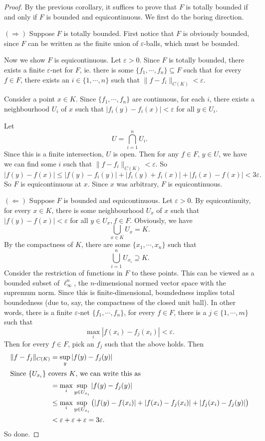 \documentclass[a4paper]{article}
\begin{document}
\begin{proof}
  By the previous corollary, it suffices to prove that $F$ is totally bounded if and only if $F$ is bounded and equicontinuous. We first do the boring direction.

  $(\Rightarrow)$ Suppose $F$ is totally bounded. First notice that $F$ is obviously bounded, since $F$ can be written as the finite union of $\varepsilon$-balls, which must be bounded.

  Now we show $F$ is equicontinuous. Let $\varepsilon > 0$. Since $F$ is totally bounded, there exists a finite $\varepsilon$-net for $F$, ie. there is some $\{f_1, \cdots, f_n\} \subseteq F$ such that for every $f \in F$, there exists an $i\in \{1, \cdots, n\}$ such that $\|f - f_i\|_{C(K)} < \varepsilon$.

  Consider a point $x \in K$. Since $\{f_1, \cdots, f_n\}$ are continuous, for each $i$, there exists a neighbourhood $U_i$ of $x$ such that $|f_i (y) - f_i(x)| < \varepsilon$ for all $y \in U_i$.

  Let
  \[
    U = \bigcap_{i = 1}^n U_i.
  \]
  Since this is a finite intersection, $U$ is open. Then for any $f \in F$, $y \in U$, we have we can find some $i$ such that $\|f - f_i\|_{C(K)} < \varepsilon$. So
  \[
    |f(y) - f(x)| \leq |f(y) - f_i(y)| + |f_i(y) + f_i(x)| + |f_i(x) - f(x)| < 3\varepsilon.
  \]
  So $F$ is equicontinuous at $x$. Since $x$ was arbitrary, $F$ is equicontinuous.

  $(\Leftarrow)$ Suppose $F$ is bounded and equicontinuous. Let $\varepsilon > 0$. By equicontinuity, for every $x \in K$, there is some neighbourhood $U_x$ of $x$ such that $|f(y) - f(x)| < \varepsilon$ for all $y \in U_x, f \in F$. Obviously, we have
  \[
    \bigcup_{x \in K}U_x = K.
  \]
  By the compactness of $K$, there are some $\{x_1, \cdots, x_n\}$ such that
  \[
    \bigcup_{i = 1}^n U_{x_i}\supseteq K.
  \]
  Consider the restriction of functions in $F$ to these points. This can be viewed as a bounded subset of $\ell^n_{\infty}$, the $n$-dimensional normed vector space with the supremum norm. Since this is finite-dimensional, boundedness implies total boundedness (due to, say, the compactness of the closed unit ball). In other words, there is a finite $\varepsilon$-net $\{f_1, \cdots, f_n\}$, for every $f \in F$, there is a $j \in \{1, \cdots, m\}$ such that
  \[
    \max_i |f(x_i) - f_j(x_i)| < \varepsilon.
  \]
  Then for every $f \in F$, pick an $f_j$ such that the above holds. Then
  \begin{align*}
    \|f - f_j\|_{C(K)} &= \sup_y |f(y) - f_j(y)|\\
    \intertext{Since $\{U_{x_i}\}$ covers $K$, we can write this as}
    &= \max_i \sup_{y \in U_{x_i}}|f(y) - f_j(y)|\\
    &\leq \max_i \sup_{y \in U_{x_i}} \big(|f(y) - f(x_i)| + |f(x_i) - f_j(x_i)| + |f_j(x_i) - f_j(y)|\big)\\
    &< \varepsilon + \varepsilon +\varepsilon = 3\varepsilon.
  \end{align*}
  So done.
\end{proof}
\end{document}
